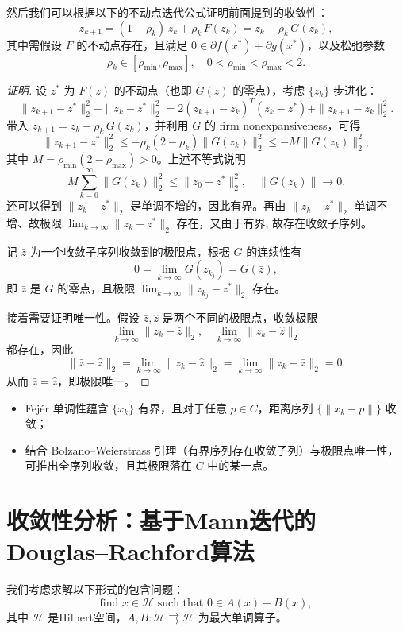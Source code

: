然后我们可以根据以下的不动点迭代公式证明前面提到的收敛性：
\[
z_{k+1} = (1-\rho_k)\,z_k + \rho_k\,F(z_k)
= z_k - \rho_k\,G(z_k),
\]
其中需假设 $F$ 的不动点存在，且满足 $0\in \partial f(x^*)+\partial g(x^*)$，以及松弛参数
\[
\rho_k\in [\rho_{\min},\rho_{\max}],\quad
0<\rho_{\min}<\rho_{\max}<2.
\]

\begin{proof}[证明]
	设 $z^*$ 为 $F(z)$ 的不动点（也即 $G(z)$ 的零点），考虑 $\{z_k\}$ 步进化：
	\[
	\|z_{k+1}-z^*\|_2^2 - \|z_k-z^*\|_2^2
	= 2(z_{k+1}-z_k)^T(z_k-z^*) + \|z_{k+1}-z_k\|_2^2.
	\]
	带入 $z_{k+1}=z_k-\rho_k\,G(z_k)$，并利用 $G$ 的 firm nonexpansiveness，可得
	\[
	\|z_{k+1}-z^*\|_2^2
	\le -\rho_k(2-\rho_k)\|G(z_k)\|_2^2
	\le -M\|G(z_k)\|_2^2,
	\]
	其中 $M = \rho_{\min}(2-\rho_{\max})>0$。上述不等式说明
	\[
	M\sum_{k=0}^\infty \|G(z_k)\|_2^2 \le \|z_0-z^*\|_2^2,\quad
	\|G(z_k)\|\to 0.
	\]
	还可以得到 $\|z_k - z^*\|_2$ 是单调不增的，因此有界。再由 $\|z_k - z^*\|_2$ 单调不增、故极限 $\lim_{k\to\infty}\|z_k-z^*\|_2$ 存在，又由于有界, 故存在收敛子序列。
	
	记 $\bar z$ 为一个收敛子序列收敛到的极限点，根据 $G$ 的连续性有
	\[
	0 = \lim_{k\to\infty} G(z_{k_j}) = G(\bar z),
	\]
	即 $\bar z$ 是 $G$ 的零点，且极限 $\lim_{k\to\infty}\|z_{k_j}-z^*\|_2$ 存在。
	
	接着需要证明唯一性。假设 $\bar z,\hat z$ 是两个不同的极限点，收敛极限
	\[
	\lim_{k\to\infty}\|z_k-\bar z\|_2,\quad
	\lim_{k\to\infty}\|z_k-\hat z\|_2
	\]
	都存在，因此
	\[
	\|\bar z-\hat z\|_2
	= \lim_{k\to\infty}\|z_k-\hat z\|_2
	= \lim_{k\to\infty}\|z_k-\bar z\|_2 = 0.
	\]
	从而 $\bar z = \hat z$，即极限唯一。
\end{proof}
\begin{shaded}
	\begin{itemize}
		\item Fejér 单调性蕴含 $\{x_k\}$ 有界，且对于任意 $p\in C$，距离序列 $\{\|x_k-p\|\}$ 收敛；  
		\item 结合 Bolzano–Weierstrass 引理（有界序列存在收敛子列）与极限点唯一性，可推出全序列收敛，且其极限落在 $C$ 中的某一点。		
	\end{itemize}
\end{shaded}
\section{收敛性分析：基于Mann迭代的Douglas–Rachford算法}

我们考虑求解以下形式的包含问题：
\[
\text{find } x \in \mathcal{H} \text{ such that } 0 \in A(x) + B(x),
\]
其中 $\mathcal{H}$ 是Hilbert空间，$A, B: \mathcal{H} \rightrightarrows \mathcal{H}$ 为最大单调算子。

